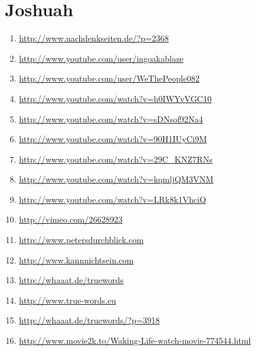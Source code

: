 \section*{Joshuah}
\begin{enumerate}
	\item \url{http://www.nachdenkseiten.de/?p=2368}
	\item \url{http://www.youtube.com/user/ingoakablaze}
	\item \url{http://www.youtube.com/user/WeThePeople082}
	\item \url{http://www.youtube.com/watch?v=h0IWYvVGC10}
	\item \url{http://www.youtube.com/watch?v=sDNsof92Na4}
	\item \url{http://www.youtube.com/watch?v=90H1IUyCi9M}
	\item \url{http://www.youtube.com/watch?v=29C_KNZ7RNs}
	\item \url{http://www.youtube.com/watch?v=kqmljQM3VNM}
	\item \url{http://www.youtube.com/watch?v=LRk8k1VhciQ}
	\item \url{http://vimeo.com/26628923}
	\item \url{http://www.petersdurchblick.com}
	\item \url{http://www.kannnichtsein.com}
	\item \url{http://whaaat.de/truewords}
	\item \url{http://www.true-words.eu}
	\item \url{http://whaaat.de/truewords/?p=3918}
	\item \url{http://www.movie2k.to/Waking-Life-watch-movie-774544.html}
\end{enumerate}
